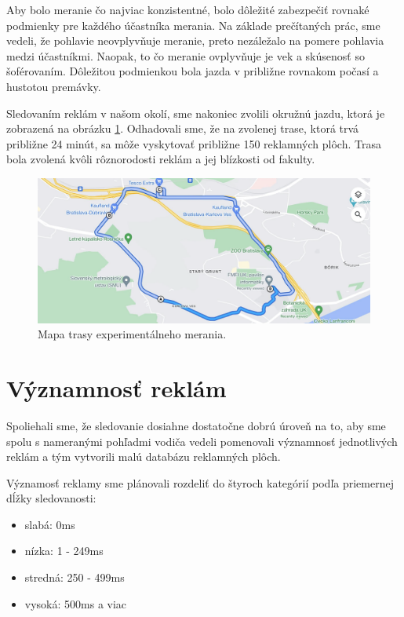 
Aby bolo meranie čo najviac konzistentné, bolo dôležité zabezpečiť rovnaké podmienky pre každého účastníka merania. Na základe prečítaných prác, %
sme vedeli, že pohlavie neovplyvňuje meranie, preto nezáležalo na pomere pohlavia medzi účastníkmi. Naopak, to čo meranie ovplyvňuje je vek a skúsenosť so šoférovaním. Dôležitou podmienkou bola jazda v približne rovnakom počasí a hustotou premávky. 

Sledovaním reklám v našom okolí, sme nakoniec zvolili okružnú jazdu, ktorá je zobrazená na obrázku \ref{img:road}. Odhadovali sme, že na zvolenej trase, ktorá trvá približne 24 minút, sa môže vyskytovať približne 150 reklamných plôch. Trasa bola zvolená kvôli rôznorodosti reklám a jej blízkosti od fakulty.

\begin{figure}[ht]
    \centering
    \includegraphics[width=1\textwidth]{images/03/map.png}
    \caption{Mapa trasy experimentálneho merania.}
    \label{img:road}
\end{figure}

\section{Významnosť reklám}

Spoliehali sme, že sledovanie dosiahne dostatočne dobrú úroveň na to, aby sme spolu s nameranými pohľadmi vodiča vedeli pomenovali významnosť jednotlivých reklám a tým vytvorili malú databázu reklamných plôch.

Významosť reklamy sme plánovali rozdeliť do štyroch kategórií podľa priemernej dĺžky sledovanosti: 

\begin{itemize}
  \item slabá: 0ms
  \item nízka: 1 - 249ms
  \item stredná: 250 - 499ms
  \item vysoká: 500ms a viac 
\end{itemize}

